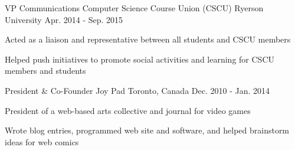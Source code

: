 \begin{cventries}
  \cventry
    {VP Communications}
    {Computer Science Course Union (CSCU)}
    {Ryerson University}
    {Apr. 2014 - Sep. 2015}
    {
      \begin{cvitems}
        \item {Acted as a liaison and representative between all students and CSCU members}
        \item {Helped push initiatives to promote social activities and learning for CSCU members and students}
      \end{cvitems}
      }
  \cventry		
  	{President \& Co-Founder}		
  	{Joy Pad}		
  	{Toronto, Canada}		
  	{Dec. 2010 - Jan. 2014}		
  	{		
    	\begin{cvitems}		
      	\item {President of a web-based arts collective and journal for video games}		
      	\item {Wrote blog entries, programmed web site and software, and helped brainstorm ideas for web comics}		
    \end{cvitems}		
   }
\end{cventries}